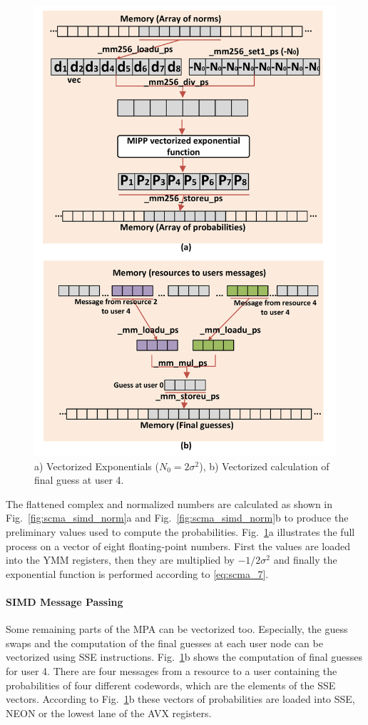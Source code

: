 \begin{figure}
  \centering
  \includegraphics[width=0.70\linewidth]{scma/simd_exp_mul/simd_exp_mul}
  \caption{a) Vectorized Exponentials ($N_ 0 = 2\sigma^2$),
           b) Vectorized calculation of final guess at user 4.}
  \label{fig:scma_simd_exp_mul}
\end{figure}

The flattened complex and normalized numbers are calculated as shown in
Fig.~\ref{fig:scma_simd_norm}a and Fig.~\ref{fig:scma_simd_norm}b to produce the
preliminary values used to compute the probabilities.
Fig.~\ref{fig:scma_simd_exp_mul}a illustrates the full process on a vector of
eight floating-point numbers. First the values are loaded into the YMM
registers, then they are multiplied by $-1/2\sigma^2$ and finally the
exponential function is performed according to \eqref{eq:scma_7}.

\paragraph{SIMD Message Passing}

Some remaining parts of the MPA can be vectorized too. Especially, the guess
swaps and the computation of the final guesses at each user node can be
vectorized using SSE instructions. Fig.~\ref{fig:scma_simd_exp_mul}b shows the
computation of final guesses for user 4. There are four messages from a resource
to a user containing the probabilities of four different codewords, which are
the elements of the SSE vectors. According to Fig.~\ref{fig:scma_simd_exp_mul}b
these vectors of probabilities are loaded into SSE, NEON or the lowest lane of
the AVX registers.

